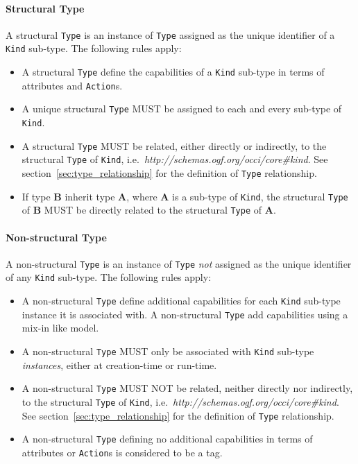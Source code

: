 \documentclass[10pt,a4paper,british]{article}
\newcommand{\hl}{\texttt}
\begin{document}
\paragraph*{Structural Type}
A structural \hl{Type} is an instance of \hl{Type} assigned as the unique
identifier of a \hl{Kind} sub-type. The following rules apply:
\begin{itemize}
\item A structural \hl{Type} define the capabilities of a \hl{Kind} sub-type in terms of attributes and \hl{Action}s.
\item A unique structural \hl{Type} MUST be assigned to each and every sub-type
 of \hl{Kind}.
\item A structural \hl{Type} MUST be related, either directly or indirectly, to
 the structural \hl{Type} of \hl{Kind},
 i.e.~\textit{http://schemas.ogf.org/occi/core\#kind}.
 See section~\ref{sec:type_relationship} for the definition of \hl{Type}
 relationship.
\item If type {\bf B} inherit type {\bf A}, where {\bf A} is a sub-type of
 \hl{Kind}, the structural \hl{Type} of {\bf B} MUST be directly related to the
 structural \hl{Type} of {\bf A}.
\end{itemize}

\paragraph*{Non-structural Type} A non-structural \hl{Type} is an instance of
\hl{Type} {\em not} assigned as the unique identifier of any \hl{Kind} sub-type.
The following rules apply:
\begin{itemize}
\item A non-structural \hl{Type} define additional capabilities for each
 \hl{Kind} sub-type instance it is associated with. A non-structural \hl{Type}
 add capabilities using a mix-in like model.
\item A non-structural \hl{Type} MUST only be associated with \hl{Kind}
 sub-type {\em instances}, either at creation-time or run-time.
\item A non-structural \hl{Type} MUST NOT be related, neither directly nor
 indirectly, to the structural \hl{Type} of \hl{Kind},
 i.e.~\textit{http://schemas.ogf.org/occi/core\#kind}.
 See section~\ref{sec:type_relationship} for the definition of \hl{Type}
 relationship.
\item A non-structural \hl{Type} defining no additional capabilities in terms
 of attributes or \hl{Action}s is considered to be a tag.
\end{itemize}
\end{document}
